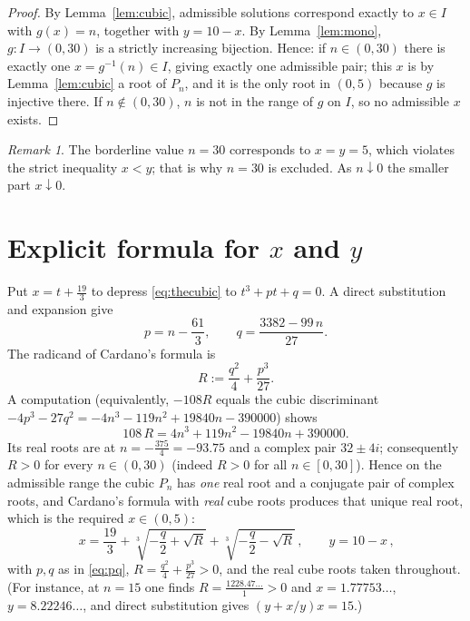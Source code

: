 \documentclass{amsart}
\theoremstyle{remark}
\newtheorem{remark}{Remark}
\begin{document}
\begin{proof}
By Lemma~\ref{lem:cubic}, admissible solutions correspond exactly to
$x\in I$ with $g(x)=n$, together with $y=10-x$. By Lemma~\ref{lem:mono},
$g\colon I\to(0,30)$ is a strictly increasing bijection. Hence:
if $n\in(0,30)$ there is exactly one $x=g^{-1}(n)\in I$, giving exactly one
admissible pair; this $x$ is by Lemma~\ref{lem:cubic} a root of $P_n$, and it is
the only root in $(0,5)$ because $g$ is injective there. If $n\notin(0,30)$,
$n$ is not in the range of $g$ on $I$, so no admissible $x$ exists.
\end{proof}

\begin{remark}
The borderline value $n=30$ corresponds to $x=y=5$, which violates the strict
inequality $x<y$; that is why $n=30$ is excluded. As $n\downarrow0$ the smaller
part $x\downarrow0$.
\end{remark}

\section{Explicit formula for \texorpdfstring{$x$}{x} and \texorpdfstring{$y$}{y}}

Put $x=t+\tfrac{19}{3}$ to depress \eqref{eq:thecubic} to $t^{3}+pt+q=0$.
A direct substitution and expansion give
\begin{equation}\label{eq:pq}
p=n-\frac{61}{3},
\qquad
q=\frac{3382-99\,n}{27}.
\end{equation}
The radicand of Cardano's formula is
\[
R:=\frac{q^{2}}{4}+\frac{p^{3}}{27}.
\]
A computation (equivalently, $-108R$ equals the cubic discriminant
$-4p^{3}-27q^{2}=-4n^{3}-119n^{2}+19840n-390000$) shows
\[
108\,R=4n^{3}+119n^{2}-19840n+390000 .
\]
Its real roots are at $n=-\tfrac{375}{4}=-93.75$ and a complex pair
$32\pm 4i$; consequently $R>0$ for every $n\in(0,30)$ (indeed $R>0$ for all
$n\in[0,30]$). Hence on the admissible range the cubic $P_n$ has \emph{one}
real root and a conjugate pair of complex roots, and Cardano's formula with
\emph{real} cube roots produces that unique real root, which is the required
$x\in(0,5)$:
\begin{equation}\label{eq:cardano}
\boxed{\,x=\frac{19}{3}
   +\sqrt[3]{-\frac{q}{2}+\sqrt{R}}
   +\sqrt[3]{-\frac{q}{2}-\sqrt{R}}\,,
\qquad y=10-x\,,}
\end{equation}
with $p,q$ as in \eqref{eq:pq}, $R=\frac{q^2}{4}+\frac{p^3}{27}>0$, and the
real cube roots taken throughout. (For instance, at $n=15$ one finds
$R=\tfrac{1228.47\ldots}{1}>0$ and $x=1.77753\ldots$, $y=8.22246\ldots$, and
direct substitution gives $(y+x/y)x=15$.)
\end{document}
